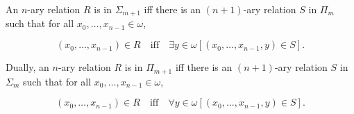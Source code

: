 An $n$-ary relation $R$ is in $\Sigma_{m+1}$ iff there is an $(n+1)$-ary relation $S$ in $\Pi_m$ such that for all $x_0, \ldots, x_{n-1} \in \omega$,

$$(x_0, \ldots, x_{n-1}) \in R \quad \text{iff} \quad \exists y \in \omega[(x_0, \ldots, x_{n-1}, y) \in S].$$

Dually, an $n$-ary relation $R$ is in $\Pi_{m+1}$ iff there is an $(n+1)$-ary relation $S$ in $\Sigma_m$ such that for all $x_0, \ldots, x_{n-1} \in \omega$,

$$(x_0, \ldots, x_{n-1}) \in R \quad \text{iff} \quad \forall y \in \omega[(x_0, \ldots, x_{n-1}, y) \in S].$$
